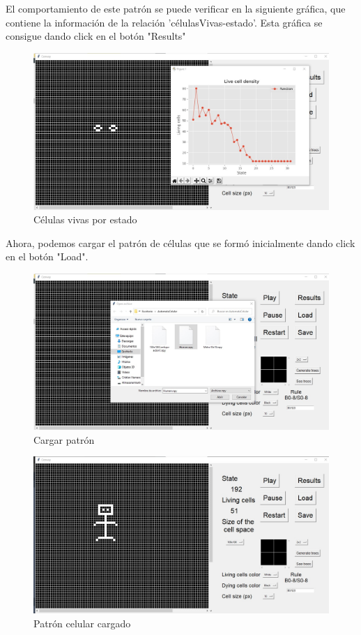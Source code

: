 \documentclass[12pt,a4paper]{book}
\begin{document}
	El comportamiento de este patrón se puede verificar en la siguiente gráfica, que contiene la información de la relación 'célulasVivas-estado'. Esta gráfica se consigue dando click en el botón "Results"
	\begin{figure}[H]
		\centering
		\includegraphics[width=1\textwidth]{imagen10PC}
		\caption{Células vivas por estado}
	\end{figure}

	Ahora, podemos cargar el patrón de células que se formó inicialmente dando click en el botón "Load".
	\begin{figure}[H]
		\centering
		\includegraphics[width=1\textwidth]{imagen11PC}
		\caption{Cargar patrón}
	\end{figure}  
	\begin{figure}[H]
		\centering
		\includegraphics[width=1\textwidth]{imagen12PC}
		\caption{Patrón celular cargado}
	\end{figure} 
\end{document}
